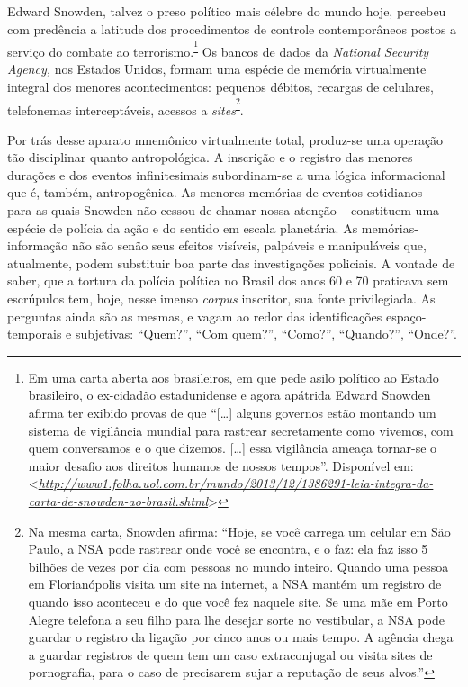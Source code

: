 Edward Snowden, talvez o preso político mais célebre do mundo hoje,
percebeu com predência a latitude dos procedimentos de controle
contemporâneos postos a serviço do combate ao
terrorismo.\textsuperscript{\footnote{Em uma carta aberta aos
  brasileiros, em que pede asilo político ao Estado brasileiro, o
  ex-cidadão estadunidense e agora apátrida Edward Snowden afirma ter
  exibido provas de que ``{[}\ldots{}{]} alguns governos estão montando
  um sistema de vigilância mundial para rastrear secretamente como
  vivemos, com quem conversamos e o que dizemos. {[}\ldots{}{]} essa
  vigilância ameaça tornar-se o maior desafio aos direitos humanos de
  nossos tempos''. Disponível em:
  \textless{}\href{http://www1.folha.uol.com.br/mundo/2013/12/1386291-leia-integra-da-carta-de-snowden-ao-brasil.shtml}{\emph{http://www1.folha.uol.com.br/mundo/2013/12/1386291-leia-integra-da-carta-de-snowden-ao-brasil.shtml}}\textgreater{}}}
Os bancos de dados da \emph{National Security Agency, }nos Estados
Unidos, formam uma espécie de memória virtualmente integral dos menores
acontecimentos: pequenos débitos, recargas de celulares, telefonemas
interceptáveis, acessos a \emph{sites}\textsuperscript{\footnote{Na
  mesma carta, Snowden afirma: ``Hoje, se você carrega um celular em São
  Paulo, a NSA pode rastrear onde você se encontra, e o faz: ela faz
  isso 5 bilhões de vezes por dia com pessoas no mundo inteiro. Quando
  uma pessoa em Florianópolis visita um site na internet, a NSA mantém
  um registro de quando isso aconteceu e do que você fez naquele site.
  Se uma mãe em Porto Alegre telefona a seu filho para lhe desejar sorte
  no vestibular, a NSA pode guardar o registro da ligação por cinco anos
  ou mais tempo. A agência chega a guardar registros de quem tem um caso
  extraconjugal ou visita sites de pornografia, para o caso de
  precisarem sujar a reputação de seus alvos.''}}.

Por trás desse aparato mnemônico virtualmente total, produz-se uma
operação tão disciplinar quanto antropológica. A inscrição e o registro
das menores durações e dos eventos infinitesimais subordinam-se a uma
lógica informacional que é, também, antropogênica. As menores memórias
de eventos cotidianos -- para as quais Snowden não cessou de chamar
nossa atenção -- constituem uma espécie de polícia da ação e do sentido
em escala planetária. As memórias-informação não são senão seus efeitos
visíveis, palpáveis e manipuláveis que, atualmente, podem substituir boa
parte das investigações policiais. A vontade de saber, que a tortura da
polícia política no Brasil dos anos 60 e 70 praticava sem escrúpulos
tem, hoje, nesse imenso \emph{corpus }inscritor, sua fonte privilegiada.
As perguntas ainda são as mesmas, e vagam ao redor das identificações
espaço-temporais e subjetivas: ``Quem?'', ``Com quem?'', ``Como?'',
``Quando?'', ``Onde?''.

